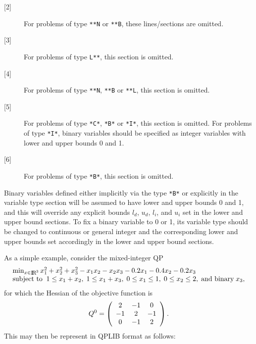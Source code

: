 \begin{description}
\item [{[2]}]
For problems of type \texttt{**N} or \texttt{**B}, these lines/sections
are omitted.
\item [{[3]}]
For problems of type \texttt{L**}, this section is omitted.
\item [{[4]}]
For problems of type \texttt{**N}, \texttt{**B} or \texttt{**L},
this section is omitted.
\item [{[5]}]
For problems of type \texttt{*C*}, \texttt{*B*} or \texttt{*I*},
this section is omitted. For problems of type \texttt{*I*}, binary variables
should be specified as integer variables with lower and upper bounds 0 and 1.
\item [{[6]}]
For problems of type \texttt{*B*}, this section is omitted.
\end{description}
Binary variables defined either implicitly via the type \texttt{*B*}
or explicitly in the variable type section will be assumed to
have lower and upper bounds 0 and 1, and this will override any
explicit bounds $l_d$, $u_d$, $l_i$, and $u_i$ set in the lower and upper
bound sections.
To fix a binary variable to 0 or 1, its variable type should be changed
to continuous or general integer and the corresponding lower and upper
bounds set accordingly in the lower and upper bound sections.

As a simple example, consider the mixed-integer QP
\[\arr{l}{\min_{x \in \smallRe^3} x_1^2 + x_2^2 + x_3^2 - x_1 x_2 - x_2 x_3
  - 0.2 x_1  -0.4 x_2 - 0.2 x_3 \\
\st 1 \leq x_1 + x_2, \; 1 \leq x_1 + x_3, \; 0 \leq x_1 \leq 1,
\; 0 \leq x_2 \leq 2, \; \mbox{and binary} \; x_3,}
\]
for which the Hessian of the objective function is
\[Q^0 = \mat{ccc}{2 & -1 & 0 \\ -1 & 2 & -1 \\ 0 & -1 & 2}.\]
This may then be represent in QPLIB format as follows:

